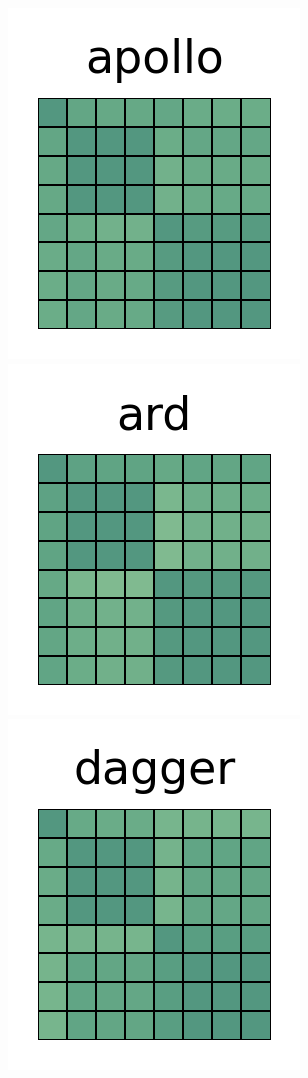 \documentclass[10pt,conference]{IEEEtran}
\begin{document}
\begin{figure}[htb!]
\centering
\centering
 \includegraphics[width=\heatmapWidth, keepaspectratio]{entropy-correlations/apollo-grids.png}
 \includegraphics[width=\heatmapWidth, keepaspectratio]{entropy-correlations/arduino-grids.png}
 \includegraphics[width=\heatmapWidth, keepaspectratio]{entropy-correlations/dagger-grids.png}

\end{figure}
\end{document}
